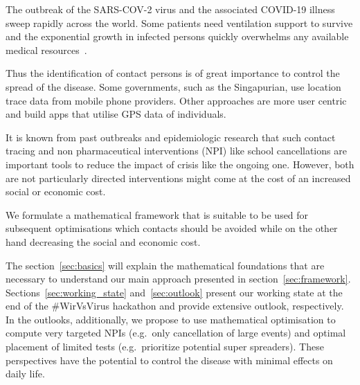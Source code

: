 
The outbreak of the SARS-COV-2 virus and the associated COVID-19 illness sweep rapidly across the world. Some patients need ventilation support to survive and the exponential growth in infected persons quickly overwhelms any available medical resources~\cite{10.1001/jama.2020.2648}.

Thus the identification of contact persons is of great importance to control the spread of the disease. Some governments, such as the Singapurian, use location trace data from mobile phone providers. Other approaches are more user centric and build apps that utilise GPS data of individuals.

It is known from past outbreaks and epidemiologic research that such contact tracing and non pharmaceutical interventions (NPI) like school cancellations are important tools to reduce the impact of crisis like the ongoing one. However, both are not particularly directed interventions might come at the cost of an increased social or economic cost.

We formulate a mathematical framework that is suitable to be used for subsequent optimisations which contacts should be avoided while on the other hand decreasing the social and economic cost.

The section~\ref{sec:basics} will explain the mathematical foundations that are necessary to understand our main approach presented in section~\ref{sec:framework}. Sections~\ref{sec:working_state} and~\ref{sec:outlook} present our working state at the end of the \#WirVsVirus hackathon and provide extensive outlook, respectively. In the outlooks, additionally, we propose to use mathematical optimisation to compute very targeted NPIs (e.g.\ only cancellation of large events) and optimal placement of limited tests (e.g.\ prioritize potential super spreaders). These perspectives have the potential to control the disease with minimal effects on daily life.